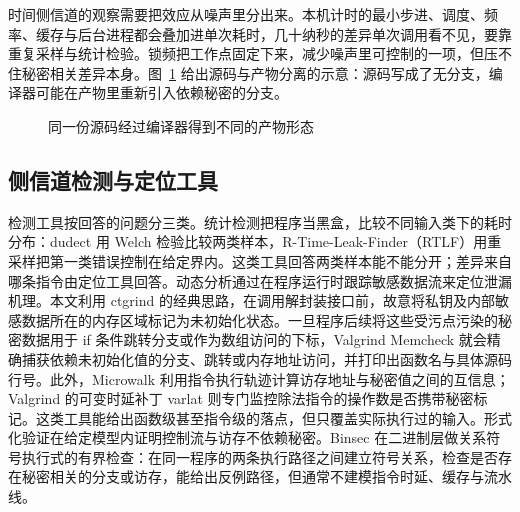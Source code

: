 时间侧信道的观察需要把效应从噪声里分出来。本机计时的最小步进、调度、频率、缓存与后台进程都会叠加进单次耗时，几十纳秒的差异单次调用看不见，要靠重复采样与统计检验。锁频把工作点固定下来，减少噪声里可控制的一项，但压不住秘密相关差异本身。图~\ref{fig:source} 给出源码与产物分离的示意：源码写成了无分支，编译器可能在产物里重新引入依赖秘密的分支。

\begin{figure}[htbp]
\centering
{}
\caption{同一份源码经过编译器得到不同的产物形态}
\label{fig:source}
\end{figure}

\subsection{侧信道检测与定位工具}

检测工具按回答的问题分三类。统计检测把程序当黑盒，比较不同输入类下的耗时分布：dudect 用 Welch 检验比较两类样本，R-Time-Leak-Finder（RTLF）用重采样把第一类错误控制在给定界内。这类工具回答两类样本能不能分开；差异来自哪条指令由定位工具回答。动态分析通过在程序运行时跟踪敏感数据流来定位泄漏机理。本文利用 ctgrind\cite{ctgrind} 的经典思路，在调用解封装接口前，故意将私钥及内部敏感数据所在的内存区域标记为未初始化状态。一旦程序后续将这些受污点污染的秘密数据用于 if 条件跳转分支或作为数组访问的下标，Valgrind Memcheck 就会精确捕获依赖未初始化值的分支、跳转或内存地址访问，并打印出函数名与具体源码行号。此外，Microwalk\cite{microwalk} 利用指令执行轨迹计算访存地址与秘密值之间的互信息；Valgrind 的可变时延补丁 varlat\cite{kyberslash} 则专门监控除法指令的操作数是否携带秘密标记。这类工具能给出函数级甚至指令级的落点，但只覆盖实际执行过的输入。形式化验证在给定模型内证明控制流与访存不依赖秘密。Binsec 在二进制层做关系符号执行式的有界检查：在同一程序的两条执行路径之间建立符号关系，检查是否存在秘密相关的分支或访存，能给出反例路径，但通常不建模指令时延、缓存与流水线。

